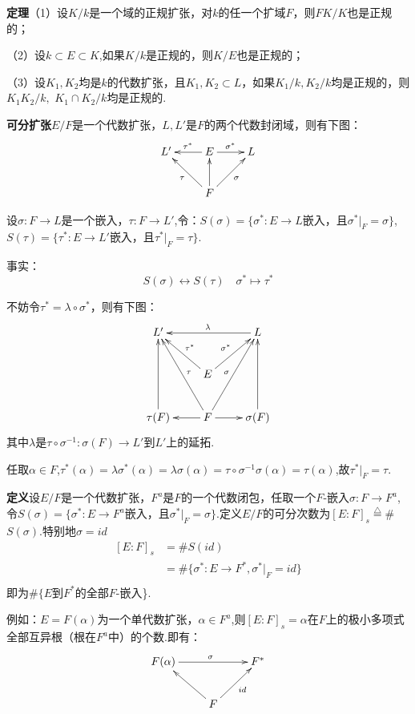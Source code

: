 \documentclass[UTF8]{article}
\begin{document}
\textbf{定理}\quad（1）设$K/k$是一个域的正规扩张，对$k$的任一个扩域$F$，则$FK/K$也是正规的；

（2）设$k\subset E\subset K$,如果$K/k$是正规的，则$K/E$也是正规的；

（3）设$K_1,K_2$均是$k$的代数扩张，且$K_1,K_2\subset L$，如果$K_1/k,K_2/k$均是正规的，则$K_1K_2/k,$ ${K_1\cap K_2}/k$均是正规的.

\textbf{可分扩张}\quad$E/F$是一个代数扩张，$L,L'$是$F$的两个代数封闭域，则有下图：$$\xymatrix{L'&E\ar[l]_{\tau^*}\ar[r]^{\sigma^*}&L\\&F\ar[lu]^{\tau} \ar[u]\ar[ru]_{\sigma}&} $$

设$\sigma:F\rightarrow L$是一个嵌入，$\tau:F\rightarrow L'$,令：$S(\sigma)=\{\sigma^*:E\rightarrow L$嵌入，且$\sigma^*|_F=\sigma\}$,$S(\tau)=\{\tau^*:E\rightarrow L'$嵌入，且$\tau^*|_F=\tau\}$.

事实：$$S(\sigma)\longleftrightarrow S(\tau) \quad\sigma^*\longmapsto\tau^*$$

不妨令$\tau^*=\lambda\circ\sigma^*$，则有下图：$$\xymatrix{L'&&L\ar[ll]_{\lambda}\\&E\ar[lu]_{\tau^*} \ar[ru]^{\sigma^*}&\\ \tau(F)\ar[uu]&F\ar[l]\ar[luu]_{\tau}\ar[ruu]^{\sigma}\ar[r]&\sigma(F)\ar[uu]} $$其中$\lambda$是$\tau\circ\sigma^{-1}:\sigma(F)\rightarrow L'$到$L'$上的延拓.

任取$\alpha\in F$,$\tau^*(\alpha)=\lambda\sigma^*(\alpha)=\lambda\sigma(\alpha)=\tau\circ\sigma^{-1}\sigma(\alpha)=\tau(\alpha)$,故$\tau^*|_F=\tau$.

\textbf{定义}\quad 设$E/F$是一个代数扩张，$F^a$是$F$的一个代数闭包，任取一个$F$-嵌入$\sigma:F\rightarrow F^a$,令$S(\sigma)=\{\sigma^*:E\rightarrow F^a$嵌入，且$\sigma^*|_F=\sigma\}$.定义$E/F$的可分次数为$[E:F]_s\stackrel{\bigtriangleup}{=}$\# $S(\sigma).$特别地$\sigma=id$
\[
\begin{split}
[E:F]_s&=\# S(id)\\
&=\# \{\sigma^*:E\rightarrow F^*,\sigma^*|_F=id\}\\
\end{split}
\]
即为$\# \{E$到$F^*$的全部$F$-嵌入\}.

例如：$E=F(\alpha)$为一个单代数扩张，$\alpha\in F^a$,则$[E:F]_s=\alpha$在$F$上的极小多项式全部互异根（根在$F^a$中）的个数.即有：$$\xymatrix{F(\alpha)\ar[rr]^{\sigma}&&{F^*}\\& F\ar[lu] \ar[ru]_{id} & }$$
\end{document}
